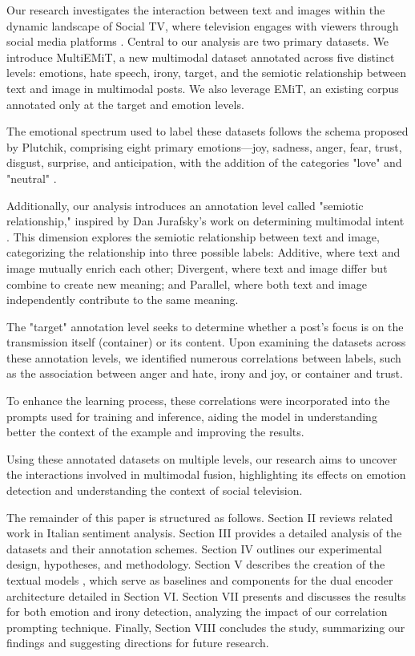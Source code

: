 \documentclass[letterpaper,journal]{IEEEtran}
\begin{document}
Our research investigates the interaction between text and images within the dynamic landscape of Social TV, where television engages with viewers through social media platforms \cite{SocialTV}. Central to our analysis are two primary datasets. We introduce MultiEMiT, a new multimodal dataset annotated across five distinct levels: emotions, hate speech, irony, target, and the semiotic relationship between text and image in multimodal posts. We also leverage EMiT, an existing corpus annotated only at the target and emotion levels\cite{emit}.

The emotional spectrum used to label these datasets follows the schema proposed by Plutchik, comprising eight primary emotions—joy, sadness, anger, fear, trust, disgust, surprise, and anticipation, with the addition of the categories "love" and "neutral" \cite{Plutchik}.

Additionally, our analysis introduces an annotation level called "semiotic relationship," inspired by Dan Jurafsky's work on determining multimodal intent \cite{MultiM}. This dimension explores the semiotic relationship between text and image, categorizing the relationship into three possible labels: Additive, where text and image mutually enrich each other; Divergent, where text and image differ but combine to create new meaning; and Parallel, where both text and image independently contribute to the same meaning.

The "target" annotation level seeks to determine whether a post's focus is on the transmission itself (container) or its content. 
Upon examining the datasets across these annotation levels, we identified numerous correlations between labels, such as the association between anger and hate, irony and joy, or container and trust.

To enhance the learning process, these correlations were incorporated into the prompts used for training and inference, aiding the model in understanding better the context of the example and improving the results.

Using these annotated datasets on multiple levels, our research aims to uncover the interactions involved in multimodal fusion, highlighting its effects on emotion detection and understanding the context of social television.

The remainder of this paper is structured as follows. Section II reviews related work in Italian sentiment analysis. Section III provides a detailed analysis of the datasets and their annotation schemes. Section IV outlines our experimental design, hypotheses, and methodology. Section V describes the creation of the textual models , which serve as baselines and components for the dual encoder architecture detailed in Section VI. Section VII presents and discusses the results for both emotion and irony detection, analyzing the impact of our correlation prompting technique. Finally, Section VIII concludes the study, summarizing our findings and suggesting directions for future research.
\end{document}
